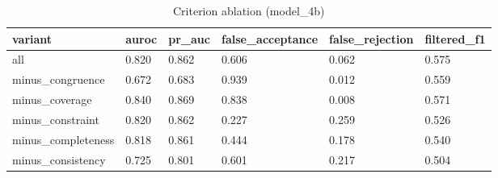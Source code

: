 \begin{table}[t]
\centering
\small
\begin{tabular}{llllll}
\hline
variant & auroc & pr\_auc & false\_acceptance & false\_rejection & filtered\_f1 \\
\hline
all & 0.820 & 0.862 & 0.606 & 0.062 & 0.575 \\
minus\_congruence & 0.672 & 0.683 & 0.939 & 0.012 & 0.559 \\
minus\_coverage & 0.840 & 0.869 & 0.838 & 0.008 & 0.571 \\
minus\_constraint & 0.820 & 0.862 & 0.227 & 0.259 & 0.526 \\
minus\_completeness & 0.818 & 0.861 & 0.444 & 0.178 & 0.540 \\
minus\_consistency & 0.725 & 0.801 & 0.601 & 0.217 & 0.504 \\
\hline
\end{tabular}
\caption{Criterion ablation (model\_4b)}
\label{tab:ablation_model_4b}
\end{table}
